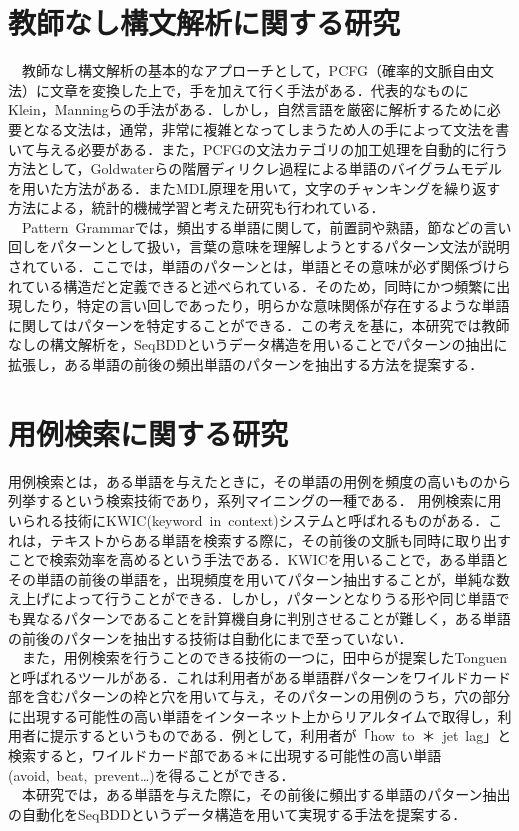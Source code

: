 \documentclass[12pt,twoside, fleqn]{ujbook}
\begin{document}
\section{教師なし構文解析に関する研究}
　教師なし構文解析の基本的なアプローチとして，PCFG（確率的文脈自由文法）に文章を変換した上で，手を加えて行く手法がある．代表的なものにKlein，Manningら\cite{Klein:2003:AUP:1075096.1075150}の手法がある．しかし，自然言語を厳密に解析するために必要となる文法は，通常，非常に複雑となってしまうため人の手によって文法を書いて与える必要がある．また，PCFGの文法カテゴリの加工処理を自動的に行う方法として，Goldwaterらの階層ディリクレ過程による単語のバイグラムモデルを用いた方法\cite{Goldwater:2006:CDU:1220175.1220260}がある．またMDL原理を用いて，文字のチャンキングを繰り返す方法\cite{MDLchang}による，統計的機械学習と考えた研究も行われている．\\
　Pattern\ Grammar\cite{pattern-grammar}では，頻出する単語に関して，前置詞や熟語，節などの言い回しをパターンとして扱い，言葉の意味を理解しようとするパターン文法が説明されている．ここでは，単語のパターンとは，単語とその意味が必ず関係づけられている構造だと定義できると述べられている．そのため，同時にかつ頻繁に出現したり，特定の言い回しであったり，明らかな意味関係が存在するような単語に関してはパターンを特定することができる．この考えを基に，本研究では教師なしの構文解析を，SeqBDDというデータ構造を用いることでパターンの抽出に拡張し，ある単語の前後の頻出単語のパターンを抽出する方法を提案する．



\section{用例検索に関する研究}
用例検索とは，ある単語を与えたときに，その単語の用例を頻度の高いものから列挙するという検索技術であり，系列マイニングの一種である．
用例検索に用いられる技術にKWIC(keyword\ in\ context)システムと呼ばれるものがある．これは，テキストからある単語を検索する際に，その前後の文脈も同時に取り出すことで検索効率を高めるという手法である．KWICを用いることで，ある単語とその単語の前後の単語を，出現頻度を用いてパターン抽出することが，単純な数え上げによって行うことができる．しかし，パターンとなりうる形や同じ単語でも異なるパターンであることを計算機自身に判別させることが難しく，ある単語の前後のパターンを抽出する技術は自動化にまで至っていない．\\
　また，用例検索を行うことのできる技術の一つに，田中らが提案したTonguen\cite{journals/ir/Tanaka-IshiiI07}と呼ばれるツールがある．これは利用者がある単語群パターンをワイルドカード部を含むパターンの枠と穴を用いて与え，そのパターンの用例のうち，穴の部分に出現する可能性の高い単語をインターネット上からリアルタイムで取得し，利用者に提示するというものである．例として，利用者が「how\ to\ ＊\ jet\ lag」と検索すると，ワイルドカード部である＊に出現する可能性の高い単語(avoid,\ beat,\ prevent…)を得ることができる．\\
　本研究では，ある単語を与えた際に，その前後に頻出する単語のパターン抽出の自動化をSeqBDDというデータ構造を用いて実現する手法を提案する．
\end{document}
